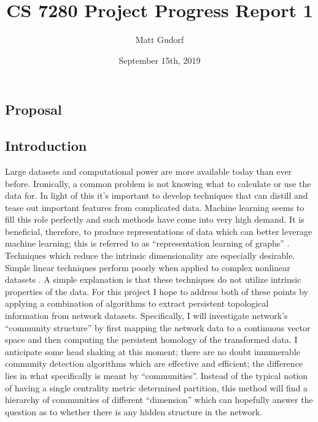 \documentclass[letter,10pt,openany]{article}
\begin{document}
\title{CS 7280 Project Progress Report 1}
\author{Matt Gudorf}
\date{September 15th, 2019} \Private{\date{\today}}

\maketitle


\subsection{Proposal}

\subsection{Introduction}
    Large datasets and computational power are more available today than
ever before. Ironically, a common problem is not knowing what to calculate
or use the data for. In light of this it's important to develop
techniques that can distill and tease out important features from complicated
data.
Machine learning seems to fill this role perfectly and such methods have come
into very high demand. It is beneficial, therefore, to produce representations
of data which can better leverage machine learning; this is referred to
as ``representation learning of graphs'' \cite{RepLearning}.
Techniques which reduce the intrinsic dimensionality are especially
desirable. Simple linear techniques perform poorly
when applied to complex nonlinear datasets \cite{Maaten08}. A simple
explanation is that these techniques
do not utilize intrinsic properties of the data. For this project I hope
to address both of these points by applying a combination
of algorithms to extract persistent topological
information from network datasets. Specifically, I will investigate
network's ``community structure'' by first
mapping the network data to a continuous vector space and then
computing the persistent homology of the transformed data.
I anticipate some head shaking at this moment; there are no doubt
innumerable community detection algorithms which are effective and efficient;
the difference lies in what specifically is meant by ``communities''.
Instead of the typical notion of having a single centrality metric
determined partition, this method will
find a hierarchy of communities
of different ``dimension'' which can hopefully answer
the question as to whether there is any hidden structure in the network.
\end{document}

